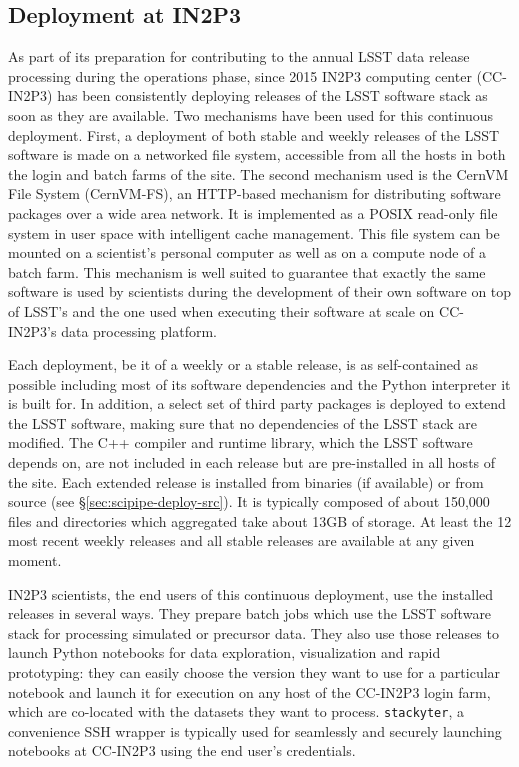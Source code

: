 \subsection{Deployment at IN2P3}

As part of its preparation for contributing to the annual LSST data release processing during the operations phase, since 2015 IN2P3 computing center (CC-IN2P3) has been consistently deploying releases of the LSST software stack as soon as they are available.
Two mechanisms have been used for this continuous deployment. First, a deployment of both stable and weekly releases of the LSST software is made on a networked file system, accessible from all the hosts in both the login and batch farms of the site. The second mechanism used is the CernVM File System (CernVM-FS)\cite{1742-6596-331-4-042003}, an HTTP-based mechanism for distributing software packages over a wide area network. It is implemented as a POSIX read-only file system in user space with intelligent cache management. This file system can be mounted on a scientist's personal computer as well as on a compute node of a batch farm. This mechanism is well suited to guarantee that exactly the same software is used by scientists during the development of their own software on top of LSST's and the one used when executing their software at scale on CC-IN2P3's data processing platform.

\noindent Each deployment, be it of a weekly or a stable release, is as self-contained as possible including most of its software dependencies and the Python interpreter it is built for. In addition, a select set of third party packages is deployed to extend the LSST software, making sure that no dependencies of the LSST stack are modified. The C++ compiler and runtime library, which the LSST software depends on, are not included in each release but are pre-installed in all hosts of the site.
Each extended release is installed from binaries (if available) or from source (see \S\ref{sec:scipipe-deploy-src}). It is typically composed of about 150,000 files and directories which aggregated take about 13GB of storage. At least the 12 most recent weekly releases and all stable releases are available at any given moment.

\noindent IN2P3 scientists, the end users of this continuous deployment, use the installed releases in several ways. They prepare batch jobs which use the LSST software stack for processing simulated or precursor data. They also use those releases to launch Python notebooks for data exploration, visualization and rapid prototyping: they can easily choose the version they want to use for a particular notebook and launch it for execution on any host of the CC-IN2P3 login farm, which are co-located with the datasets they want to process.
\texttt{stackyter}\cite{stackyter}, a convenience SSH wrapper is typically used for seamlessly and securely launching notebooks at CC-IN2P3 using the end user's credentials.

